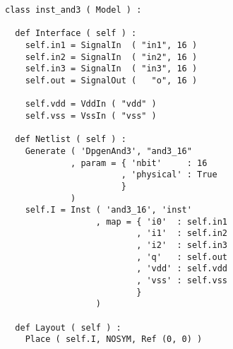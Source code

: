 \begin{itemize}
\begin{verbatim}
class inst_and3 ( Model ) :

  def Interface ( self ) :
    self.in1 = SignalIn  ( "in1", 16 )
    self.in2 = SignalIn  ( "in2", 16 )
    self.in3 = SignalIn  ( "in3", 16 )
    self.out = SignalOut (   "o", 16 )

    self.vdd = VddIn ( "vdd" )
    self.vss = VssIn ( "vss" )
    
  def Netlist ( self ) :
    Generate ( 'DpgenAnd3', "and3_16"
             , param = { 'nbit'     : 16
                       , 'physical' : True
                       }
             )       
    self.I = Inst ( 'and3_16', 'inst'
                  , map = { 'i0'  : self.in1
                          , 'i1'  : self.in2
                          , 'i2'  : self.in3
                          , 'q'   : self.out
                          , 'vdd' : self.vdd
                          , 'vss' : self.vss
                          }
                  )
    
  def Layout ( self ) :
    Place ( self.I, NOSYM, Ref (0, 0) )
\end{verbatim}
\end{itemize}
